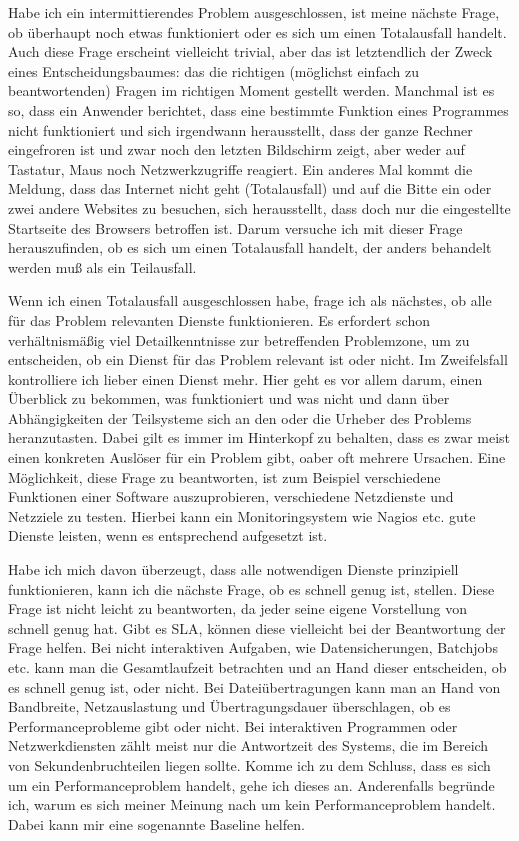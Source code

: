 \begin{normaltext}
  Habe ich ein intermittierendes Problem ausgeschlossen, ist meine nächste
  Frage, ob überhaupt noch etwas funktioniert oder es sich um einen
  Totalausfall handelt. Auch diese Frage erscheint vielleicht trivial, aber
  das ist letztendlich der Zweck eines Entscheidungsbaumes: das die richtigen
  (möglichst einfach zu beantwortenden) Fragen im richtigen Moment gestellt
  werden. Manchmal ist es so, dass ein Anwender berichtet, dass eine bestimmte
  Funktion eines Programmes nicht funktioniert und sich irgendwann
  herausstellt, dass der ganze Rechner eingefroren ist und zwar noch den
  letzten Bildschirm zeigt, aber weder auf Tastatur, Maus noch
  Netzwerkzugriffe reagiert. Ein anderes Mal kommt die Meldung, dass das
  Internet nicht geht (Totalausfall) und auf die Bitte ein oder zwei andere
  Websites zu besuchen, sich herausstellt, dass doch nur die eingestellte
  Startseite des Browsers betroffen ist. Darum versuche ich mit dieser Frage
  herauszufinden, ob es sich um einen Totalausfall handelt, der anders
  behandelt werden muß als ein Teilausfall.

  Wenn ich einen Totalausfall ausgeschlossen habe, frage ich als nächstes, ob
  alle für das Problem relevanten Dienste funktionieren. Es erfordert schon
  verhältnismäßig viel Detailkenntnisse zur betreffenden Problemzone, um zu
  entscheiden, ob ein Dienst für das Problem relevant ist oder nicht. Im
  Zweifelsfall kontrolliere ich lieber einen Dienst mehr. Hier geht es vor
  allem darum, einen Überblick zu bekommen, was funktioniert und was nicht und
  dann über Abhängigkeiten der Teilsysteme sich an den oder die Urheber des
  Problems heranzutasten. Dabei gilt es immer im Hinterkopf zu behalten, dass
  es zwar meist einen konkreten Auslöser für ein Problem gibt, oaber oft
  mehrere Ursachen. Eine Möglichkeit, diese Frage zu beantworten, ist zum
  Beispiel verschiedene Funktionen einer Software auszuprobieren, verschiedene
  Netzdienste und Netzziele zu testen. Hierbei kann ein Monitoringsystem wie
  Nagios etc. gute Dienste leisten, wenn es entsprechend aufgesetzt ist.

  Habe ich mich davon überzeugt, dass alle notwendigen Dienste prinzipiell
  funktionieren, kann ich die nächste Frage, ob es schnell genug ist, stellen.
  Diese Frage ist nicht leicht zu beantworten, da jeder seine eigene
  Vorstellung von schnell genug hat. Gibt es SLA, können diese vielleicht bei
  der Beantwortung der Frage helfen. Bei nicht interaktiven Aufgaben, wie
  Datensicherungen, Batchjobs etc. kann man die Gesamtlaufzeit betrachten und
  an Hand dieser entscheiden, ob es schnell genug ist, oder nicht. Bei
  Dateiübertragungen kann man an Hand von Bandbreite, Netzauslastung und
  Übertragungsdauer überschlagen, ob es Performanceprobleme gibt oder nicht.
  Bei interaktiven Programmen oder Netzwerkdiensten zählt meist nur die
  Antwortzeit des Systems, die im Bereich von Sekundenbruchteilen liegen
  sollte. Komme ich zu dem Schluss, dass es sich um ein Performanceproblem
  handelt, gehe ich dieses an. Anderenfalls begründe ich, warum es sich meiner
  Meinung nach um kein Performanceproblem handelt. Dabei kann mir eine
  sogenannte Baseline helfen.


\end{normaltext}
